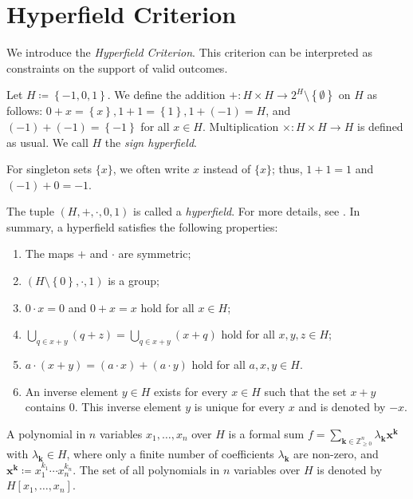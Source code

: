 \chapter{Hyperfield Criterion}

We introduce the \emph{Hyperfield Criterion}. This criterion can be interpreted as constraints on the support of valid outcomes.

\begin{definition}
    Let \( H \coloneqq \left\{ -1, 0, 1 \right\} \). We define the addition \( + : H \times H \to 2^H \setminus \left\{ \emptyset \right\} \) on \( H \) as follows: \( 0 + x = \left\{ x \right\},  1 + 1 = \left\{ 1 \right\},1 + (-1) = H \), and \( (-1) + (-1) = \left\{ -1 \right\} \) for all \( x \in H \).
    Multiplication \( \times : H \times H \to H \) is defined as usual. We call \( H \) the \emph{sign hyperfield}.
\end{definition}

For singleton sets \( \{ x \} \), we often write \( x \) instead of \( \{ x \} \); thus, \( 1 + 1 = 1 \) and \( (-1) + 0 = -1 \).

\begin{remark}
    The tuple \( (H, + , \cdot, 0, 1) \) is called a \emph{hyperfield}. For more details, see \cite{baker2018matroids}. In summary, a hyperfield satisfies the following properties:
    \begin{enumerate}
        \item  The maps \( + \) and \( \cdot \) are symmetric;
        \item \( (H \setminus \left\{ 0 \right\}, \cdot, 1) \) is a group;
        \item \( 0 \cdot x = 0 \) and \( 0 + x = x \) hold for all \( x \in H \);
        \item \( \bigcup_{q \in x+y}(q + z) = \bigcup_{q \in x + y}(x + q) \) hold for all \( x,y,z \in H \);
        \item \( a \cdot (x + y) = (a \cdot x) + (a \cdot y) \) hold for all \( a,x,y \in H \).
        \item An inverse element \( y  \in H\) exists for every \( x \in H\) such that the set \( x + y \) contains \( 0 \). This inverse element \( y \) is unique for every \( x \) and is denoted by \( -x \).
    \end{enumerate}
\end{remark}

\begin{definition}
    A polynomial in \( n \) variables \( x_1, \dots, x_n \) over \( H \) is a formal sum \( f= \sum_{\mathbf{k} \in \mathbb{Z}^n_{\geq 0}} \lambda_{\mathbf{k}} \mathbf{x}^{\mathbf{k}} \) with \( \lambda_{\mathbf{k}} \in H \),
    where only a finite number of coefficients \( \lambda_{\mathbf{k}} \) are non-zero, and \( \mathbf{x}^{\mathbf{k}} \coloneqq x_1^{k_1} \cdots x_n^{k_n} \). The set of all polynomials in \( n \) variables over \( H \) is denoted by \( H[x_1, \dots, x_n] \).
\end{definition}

